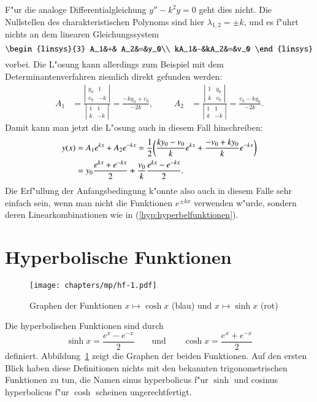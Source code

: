 F"ur die analoge Differentialgleichung $y''-k^2y=0$ geht dies nicht.
Die Nullstellen des charakteristischen Polynoms sind hier 
$\lambda_{1,2}=\pm k$, und es f"uhrt nichts an dem linearen Gleichungssystem
\[
\begin{linsys}{3}
 A_1&+& A_2&=&y_0\\
kA_1&-&kA_2&=&v_0
\end{linsys}
\]
vorbei.
Die L"osung kann allerdings zum Beispiel mit dem Determinantenverfahren
ziemlich direkt gefunden werden:
\[
\begin{aligned}
A_1
&=
\frac{\left|\begin{matrix}y_0&1\\v_0&-k\end{matrix}\right|}{\left|\begin{matrix}1&1\\k&-k\end{matrix}\right|}
=
\frac{-ky_0+v_0}{-2k},
&
&&
A_2
&=
\frac{\left|\begin{matrix}1&y_0\\k&v_0\end{matrix}\right|}{\left|\begin{matrix}1&1\\k&-k\end{matrix}\right|}
=\frac{v_0-ky_0}{-2k}.
\end{aligned}
\]
Damit kann man jetzt die L"osung auch in diesem Fall hinschreiben:
\begin{align}
y(x)
&=
A_1e^{kx}+A_2e^{-kx}
=
\frac12\biggl(
\frac{ky_0-v_0}k e^{kx}
+
\frac{-v_0+ky_0}k e^{-kx}
\biggr)
\notag
\\
&=
y_0\frac{e^{kx}+e^{-kx}}2
+\frac{v_0}{k}\frac{e^{kx}-e^{-kx}}2.
\label{hyp:hyperbelfunktionen}
\end{align}
Die Erf"ullung der Anfangsbedingung k"onnte also auch in diesem Falle
sehr einfach sein, wenn man nicht die Funktionen $e^{\pm kx}$ verwenden
w"urde, sondern deren Linearkombinationen wie in (\ref{hyp:hyperbelfunktionen}).

\section{Hyperbolische Funktionen}
\begin{figure}
\centering
\texttt{[image: chapters/mp/hf-1.pdf]}
\caption{Graphen der Funktionen $x\mapsto\cosh x$ (blau)
und $x\mapsto\sinh x$ (rot)
\label{hyp:graphen}}
\end{figure}
Die hyperbolischen Funktionen sind durch
\begin{equation}
\sinh x =\frac{e^x-e^{-x}}2
\qquad\text{und}\qquad
\cosh x = \frac{e^x+e^{-x}}2
\label{skript:sinh:definition}
\end{equation}
definiert.
%
%
%
Abbildung~\ref{hyp:graphen} zeigt die Graphen der beiden Funktionen.
Auf den ersten Blick haben diese Definitionen nichts mit den bekannten
trigonometrischen Funktionen zu tun, die Namen sinus hyperbolicus f"ur
$\sinh$ und cosinus hyperbolicus f"ur $\cosh$ scheinen ungerechtfertigt.


